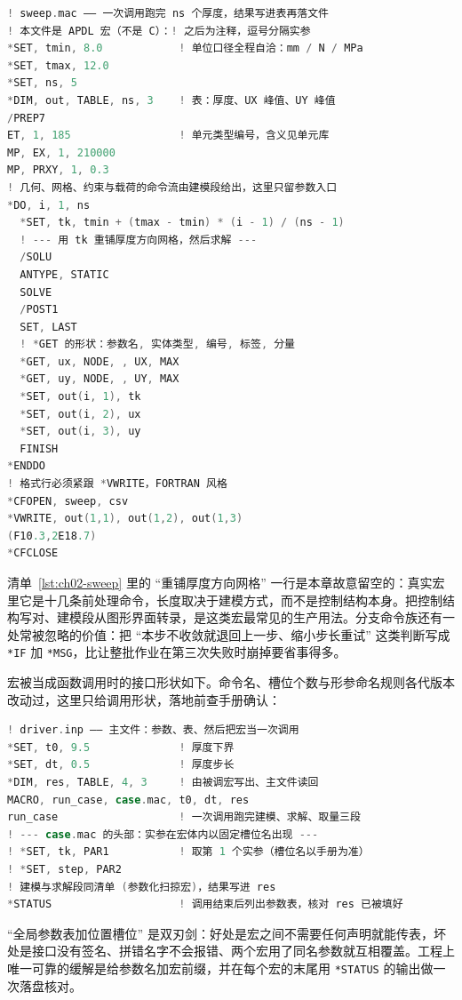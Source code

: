 \documentclass[12pt,a4paper,fontset=fandol]{ctexbook}
\newcommand{\Tp}[1]{\texttt{#1}}
\begin{document}
\begin{lstlisting}[language=C, style=cstyle,
  caption={参数化扫掠宏：循环、表数组、后处理取量与结果落地},
  label={lst:ch02-sweep}]
! sweep.mac —— 一次调用跑完 ns 个厚度，结果写进表再落文件
! 本文件是 APDL 宏（不是 C）：! 之后为注释，逗号分隔实参
*SET, tmin, 8.0            ! 单位口径全程自洽：mm / N / MPa
*SET, tmax, 12.0
*SET, ns, 5
*DIM, out, TABLE, ns, 3    ! 表：厚度、UX 峰值、UY 峰值
/PREP7
ET, 1, 185                 ! 单元类型编号，含义见单元库
MP, EX, 1, 210000
MP, PRXY, 1, 0.3
! 几何、网格、约束与载荷的命令流由建模段给出，这里只留参数入口
*DO, i, 1, ns
  *SET, tk, tmin + (tmax - tmin) * (i - 1) / (ns - 1)
  ! --- 用 tk 重铺厚度方向网格，然后求解 ---
  /SOLU
  ANTYPE, STATIC
  SOLVE
  /POST1
  SET, LAST
  ! *GET 的形状：参数名, 实体类型, 编号, 标签, 分量
  *GET, ux, NODE, , UX, MAX
  *GET, uy, NODE, , UY, MAX
  *SET, out(i, 1), tk
  *SET, out(i, 2), ux
  *SET, out(i, 3), uy
  FINISH
*ENDDO
! 格式行必须紧跟 *VWRITE，FORTRAN 风格
*CFOPEN, sweep, csv
*VWRITE, out(1,1), out(1,2), out(1,3)
(F10.3,2E18.7)
*CFCLOSE
\end{lstlisting}

清单~\ref{lst:ch02-sweep} 里的 ``重铺厚度方向网格'' 一行是本章故意留空的：真实宏里它是十几条前处理命令，长度取决于建模方式，而不是控制结构本身。把控制结构写对、建模段从图形界面转录，是这类宏最常见的生产用法。分支命令族还有一处常被忽略的价值：把 ``本步不收敛就退回上一步、缩小步长重试'' 这类判断写成 \Tp{*IF} 加 \Tp{*MSG}，比让整批作业在第三次失败时崩掉要省事得多。

宏被当成函数调用时的接口形状如下。命令名、槽位个数与形参命名规则各代版本改动过，这里只给调用形状，落地前查手册确认：

\begin{lstlisting}[language=C, style=cstyle,
  caption={把宏当函数用：主文件绑定实参，被调宏用槽位名取值},
  label={lst:ch02-macro-call}]
! driver.inp —— 主文件：参数、表、然后把宏当一次调用
*SET, t0, 9.5              ! 厚度下界
*SET, dt, 0.5              ! 厚度步长
*DIM, res, TABLE, 4, 3     ! 由被调宏写出、主文件读回
MACRO, run_case, case.mac, t0, dt, res
run_case                   ! 一次调用跑完建模、求解、取量三段
! --- case.mac 的头部：实参在宏体内以固定槽位名出现 ---
! *SET, tk, PAR1           ! 取第 1 个实参（槽位名以手册为准）
! *SET, step, PAR2
! 建模与求解段同清单 (参数化扫掠宏)，结果写进 res
*STATUS                    ! 调用结束后列出参数表，核对 res 已被填好
\end{lstlisting}

``全局参数表加位置槽位'' 是双刃剑：好处是宏之间不需要任何声明就能传表，坏处是接口没有签名、拼错名字不会报错、两个宏用了同名参数就互相覆盖。工程上唯一可靠的缓解是给参数名加宏前缀，并在每个宏的末尾用 \Tp{*STATUS} 的输出做一次落盘核对。
\end{document}
